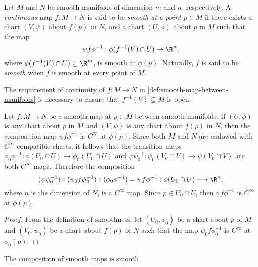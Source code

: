 \begin{definition}
\label{def:smooth-map-between-manifolds}
Let \(M\) and \(N\) be smooth manifolds of dimension \(m\) and \(n\),
respectively. A \emph{continuous} map \(f: M \to N\) is said to be \emph{smooth
  at a point \(p \in M\)} if there exists a chart \((V, \psi)\) about \(f(p)\)
in \(N\), and a chart \((U, \phi)\) about \(p\) in \(M\) such that the map
\[
\psi f \phi^{-1}: \phi(f^{-1}(V) \cap U) \to \R^n,
\]
where \(\phi(f^{-1}(V) \cap U) \subseteq \R^m\), is smooth at
\(\phi(p)\). Naturally, \(f\) is said to be \emph{smooth} when \(f\) is smooth
at every point of \(M\).
\end{definition}

\begin{remark}
\label{rem:continuous-requirement-in-smooth-map-definition}
The requirement of continuity of \(f: M \to N\) in
\cref{def:smooth-map-between-manifolds} is necessary to ensure that
\(f^{-1}(V) \subseteq M\) is open.
\end{remark}

\begin{lemma}
\label{lem:smooth-maps-choice-independent}
Let \(f: M \to N\) be a smooth map at \(p \in M\) between smooth manifolds. If
\((U, \phi)\) is any chart about \(p\) in \(M\) and \((V, \psi)\) is any chart
about \(f(p)\) in \(N\), then the composition map \(\psi f \phi^{-1}\) is
\(C^{\infty}\) at \(\phi(p)\). Since both \(M\) and \(N\) are endowed with
\(C^{\infty}\) compatible charts, it follows that the transition maps
\(\phi_0 \phi^{-1}: \phi(U_0 \cap U) \to \phi_0(U_{0} \cap U)\) and
\(\psi \psi_0^{-1}: \psi_0(V_0 \cap V) \to \psi(V_0 \cap V)\) are both
\(C^{\infty}\) maps. Therefore the composition
\[
(\psi \psi_0^{-1}) \circ (\psi_0 f \phi_0^{-1}) \circ (\phi_0 \phi^{-1})
= \psi f \phi^{-1}: \phi(U_0 \cap U) \longrightarrow \R^n,
\]
where \(n\) is the dimension of \(N\), is a \(C^{\infty}\) map. Since \(p \in
U_0 \cap U\), then \(\psi f \phi^{-1}\) is \(C^{\infty}\) at \(\phi(p)\).
\end{lemma}

\begin{proof}
From the definition of smoothness, let \((U_0, \phi_0)\) be a chart about \(p\)
of \(M\) and \((V_0, \psi_0)\) be a chart about \(f(p)\) of \(N\) such that the
map \(\psi_0 f \phi_0^{-1}\) is \(C^{\infty}\) at \(\phi_0(p)\).
\end{proof}

\begin{proposition}
\label{prop:composition-smooth-maps-is-smooth}
The composition of smooth maps is smooth.
\end{proposition}

